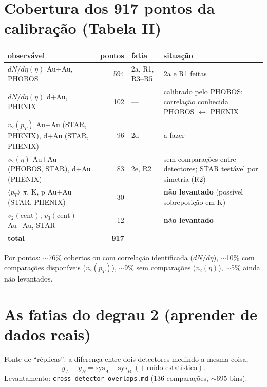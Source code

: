 \documentclass[11pt,a4paper]{article}
\newcommand{\afazer}{\textcolor{black!55}{a fazer}}
\newcommand{\arq}[1]{\texttt{\nolinkurl{#1}}}
\begin{document}
\section*{Cobertura dos 917 pontos da calibração (Tabela II)}
\begin{tabularx}{\linewidth}{@{}Y r l Y@{}}
\toprule
observável & pontos & fatia & situação \\
\midrule
$dN/d\eta(\eta)$ Au+Au, PHOBOS & 594 & 2a, R1, R3--R5 & 2a e R1 feitas \\
$dN/d\eta(\eta)$ d+Au, PHENIX & 102 & --- & calibrado pelo PHOBOS: correlação conhecida PHOBOS $\leftrightarrow$ PHENIX \\
$v_2(p_T)$ Au+Au (STAR, PHENIX), d+Au (STAR, PHENIX) & 96 & 2d & \afazer \\
$v_2(\eta)$ Au+Au (PHOBOS, STAR), d+Au (PHENIX) & 83 & 2e, R2 & sem comparações entre detectores; STAR testável por simetria (R2) \\
$\langle p_T\rangle$ $\pi$, K, p Au+Au (STAR, PHENIX) & 30 & --- & \textbf{não levantado} (possível sobreposição em K) \\
$v_2(\mathrm{cent})$, $v_3(\mathrm{cent})$ Au+Au, STAR & 12 & --- & \textbf{não levantado} \\
\midrule
\textbf{total} & \textbf{917} & & \\
\bottomrule
\end{tabularx}

Por pontos: $\sim$76\% cobertos ou com correlação identificada ($dN/d\eta$), $\sim$10\% com comparações disponíveis ($v_2(p_T)$),
$\sim$9\% sem comparações ($v_2(\eta)$), $\sim$5\% ainda não levantados.

\section*{As fatias do degrau 2 (aprender de dados reais)}
Fonte de ``réplicas'': a diferença entre dois detectores medindo a mesma coisa,
\[
y_A - y_B = \mathrm{sys}_A - \mathrm{sys}_B \;(+\,\text{ruído estatístico}).
\]
Levantamento: \arq{cross_detector_overlaps.md} (136 comparações, $\sim$695 bins).
\end{document}
